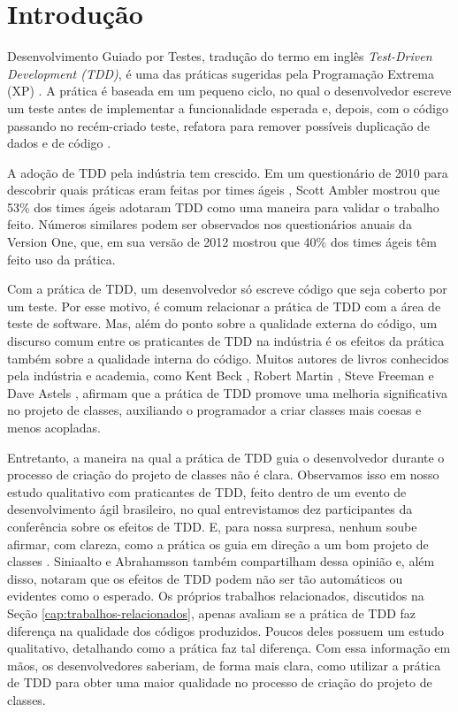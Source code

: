 \documentclass[conference]{IEEEtran}
\begin{document}

\IEEEpeerreviewmaketitle

\section{Introdução}

Desenvolvimento Guiado por Testes, tradução do termo
em inglês \textit{Test-Driven Development (TDD)},
é uma das práticas sugeridas pela Programação
Extrema (XP) \cite{XPExplained}. A prática é baseada em um pequeno ciclo, 
no qual o desenvolvedor escreve um teste antes
de implementar a funcionalidade esperada e, depois, com o código
passando no recém-criado teste, refatora para 
remover possíveis duplicação de dados e de código \cite{TDDByExample}.

A adoção de TDD pela indústria tem crescido. 
Em um questionário de 2010 para descobrir quais práticas eram feitas por times
ágeis \cite{wambler-survey-agile}, Scott Ambler mostrou que 53\% dos times ágeis
adotaram TDD como uma maneira para validar o trabalho feito.
Números similares podem ser observados nos questionários anuais da Version One, que,
em sua versão de 2012 \cite{versionone-2012} mostrou que 40\% dos times ágeis têm 
feito uso da prática.

Com a prática de TDD, um desenvolvedor só escreve código
que seja coberto por um teste. Por esse motivo, é comum relacionar a prática
de TDD com a área de teste de software. Mas, além do ponto sobre
a qualidade externa do código, um discurso comum entre os praticantes de TDD
na indústria é os efeitos da prática também sobre a qualidade interna do código.
Muitos autores de livros conhecidos pela indústria e academia, como
Kent Beck \cite{TDDByExample}, Robert Martin \cite{agile-ppp}, 
Steve Freeman \cite{GOOS} e Dave Astels \cite{astels-tdd}, afirmam que a prática de TDD
promove uma melhoria significativa no projeto de classes, auxiliando
o programador a criar classes mais coesas e menos acopladas.

Entretanto, a maneira na qual a prática de TDD guia o desenvolvedor
durante o processo de criação do projeto de classes não é clara. Observamos
isso em nosso estudo qualitativo com praticantes de TDD, feito dentro de um
evento de desenvolvimento ágil brasileiro, no qual entrevistamos dez
participantes da conferência sobre os efeitos de TDD. E, para nossa surpresa,
nenhum soube afirmar, com clareza, como a prática os guia em direção
a um bom projeto de classes \cite{aniche-wbma}.
Siniaalto e Abrahamsson \cite{alarming-results} também
compartilham dessa opinião e, além disso, notaram que os efeitos de TDD podem 
não ser tão automáticos ou evidentes como o esperado.
Os próprios trabalhos relacionados, discutidos na Seção \ref{cap:trabalhos-relacionados},
apenas avaliam se a prática de TDD faz diferença na qualidade dos códigos produzidos.
Poucos deles possuem um estudo qualitativo, detalhando como a prática
faz tal diferença.
Com essa informação em mãos, os desenvolvedores saberiam, de forma mais clara,
como utilizar a prática de TDD para obter uma maior qualidade no processo de criação
do projeto de classes. 
\end{document}
